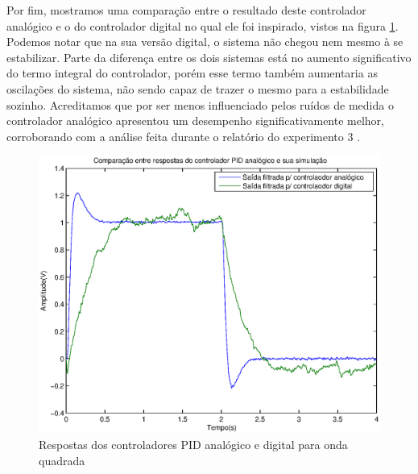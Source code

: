\documentclass{article}
\begin{document}
Por fim, mostramos uma comparação entre o resultado deste controlador analógico e o do controlador digital no qual ele foi inspirado, vistos na figura \ref{fig:yad}. Podemos notar que na sua versão digital, o sistema não chegou nem mesmo à se estabilizar. Parte da diferença entre os dois sistemas está no aumento significativo do termo integral do controlador, porém esse termo também aumentaria as oscilações do sistema, não sendo capaz de trazer o mesmo para a estabilidade sozinho. Acreditamos que por ser menos influenciado pelos ruídos de medida o controlador analógico apresentou um desempenho significativamente melhor, corroborando com a análise feita durante o relatório do experimento 3 \cite{bb:lab3}.
\begin{figure}[H]
	\centering
	\includegraphics[width=0.8\linewidth]{yad}
	\caption{Respostas dos controladores PID analógico e digital para onda quadrada}
	\label{fig:yad}
\end{figure}

\begin{thebibliography}{widestlabel}
\end{thebibliography}
\end{document}
